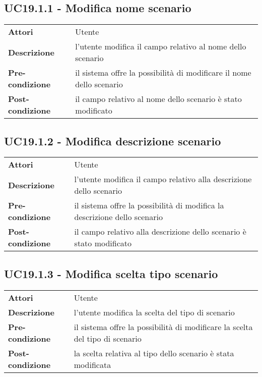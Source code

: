 \subsection{UC19.1.1 - Modifica nome scenario}
\label{sssec:UC19.1.1}
\def\arraystretch{1.5}
\begin{tabularx}{\textwidth}{l|p{}}
\rowcolor{I} \multicolumn{2}{c}{\color{white}\textbf{UC19.1.1 - Modifica nome scenario}} \\
\toprule
\endhead
\textbf{Attori} & Utente\\
\textbf{Descrizione} & l'utente modifica il campo relativo al nome dello scenario\\
\textbf{Pre-condizione} & il sistema offre la possibilità di modificare il nome dello scenario\\
\textbf{Post-condizione} & il campo relativo al nome dello scenario è stato modificato\\
\bottomrule
\end{tabularx}
\subsection{UC19.1.2 - Modifica descrizione scenario}
\label{sssec:UC19.1.2}
\def\arraystretch{1.5}
\begin{tabularx}{\textwidth}{l|p{}}
\rowcolor{I} \multicolumn{2}{c}{\color{white}\textbf{UC19.1.2 - Modifica descrizione scenario}} \\
\toprule
\endhead
\textbf{Attori} & Utente\\
\textbf{Descrizione} & l'utente modifica il campo relativo alla descrizione dello scenario\\
\textbf{Pre-condizione} & il sistema offre la possibilità di modifica la descrizione dello scenario\\
\textbf{Post-condizione} & il campo relativo alla descrizione dello scenario  è stato modificato\\
\bottomrule
\end{tabularx}
\subsection{UC19.1.3 - Modifica scelta tipo scenario}
\label{sssec:UC19.1.3}
\def\arraystretch{1.5}
\begin{tabularx}{\textwidth}{l|p{}}
\rowcolor{I} \multicolumn{2}{c}{\color{white}\textbf{UC19.1.3 - Modifica scelta tipo scenario}} \\
\toprule
\endhead
\textbf{Attori} & Utente\\
\textbf{Descrizione} & l'utente modifica la scelta del tipo di scenario\\
\textbf{Pre-condizione} & il sistema offre la possibilità di modificare la scelta del tipo di scenario\\
\textbf{Post-condizione} & la scelta relativa al tipo dello scenario è stata modificata\\
\bottomrule
\end{tabularx}
